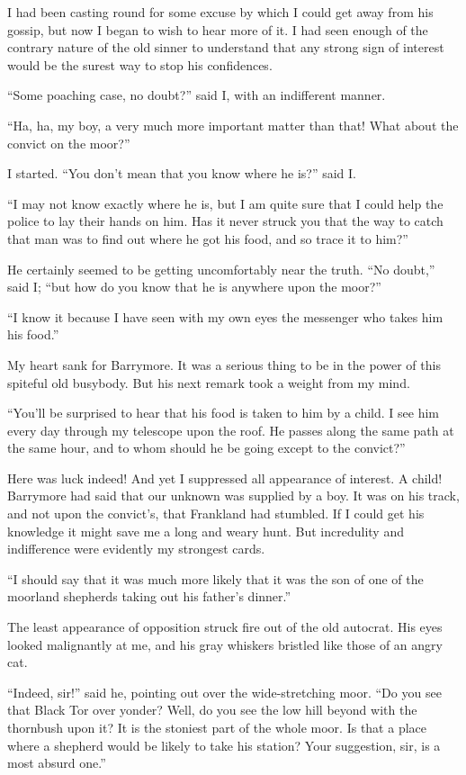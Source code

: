 \documentclass[paper=5.5in:8.5in,BCOR=7mm,twoside,DIV=calc,12pt,usegeometry,openany,chapterprefix,endperiod]{scrbook} %
\begin{document}
I had been casting round for some excuse by which I could get away from his gossip, but now I began to wish to hear more of it. I had seen enough of the contrary nature of the old sinner to understand that any strong sign of interest would be the surest way to stop his confidences.

\enquote{Some poaching case, no doubt?} said I, with an indifferent manner.

\enquote{Ha, ha, my boy, a very much more important matter than that! What about the convict on the moor?}

I started. \enquote{You don't mean that you know where he is?} said I.

\enquote{I may not know exactly where he is, but I am quite sure that I could help the police to lay their hands on him. Has it never struck you that the way to catch that man was to find out where he got his food, and so trace it to him?}

He certainly seemed to be getting uncomfortably near the truth. \enquote{No doubt,} said I; \enquote{but how do you know that he is anywhere upon the moor?}

\enquote{I know it because I have seen with my own eyes the messenger who takes him his food.}

My heart sank for Barrymore. It was a serious thing to be in the power of this spiteful old busybody. But his next remark took a weight from my mind.

\enquote{You'll be surprised to hear that his food is taken to him by a child. I see him every day through my telescope upon the roof. He passes along the same path at the same hour, and to whom should he be going except to the convict?}

Here was luck indeed! And yet I suppressed all appearance of interest. A child! Barrymore had said that our unknown was supplied by a boy. It was on his track, and not upon the convict's, that Frankland had stumbled. If I could get his knowledge it might save me a long and weary hunt. But incredulity and indifference were evidently my strongest cards.

\enquote{I should say that it was much more likely that it was the son of one of the moorland shepherds taking out his father's dinner.}

The least appearance of opposition struck fire out of the old autocrat. His eyes looked malignantly at me, and his gray whiskers bristled like those of an angry cat.

\enquote{Indeed, sir!} said he, pointing out over the wide-stretching moor. \enquote{Do you see that Black Tor over yonder? Well, do you see the low hill beyond with the thornbush upon it? It is the stoniest part of the whole moor. Is that a place where a shepherd would be likely to take his station? Your suggestion, sir, is a most absurd one.}
\end{document}

